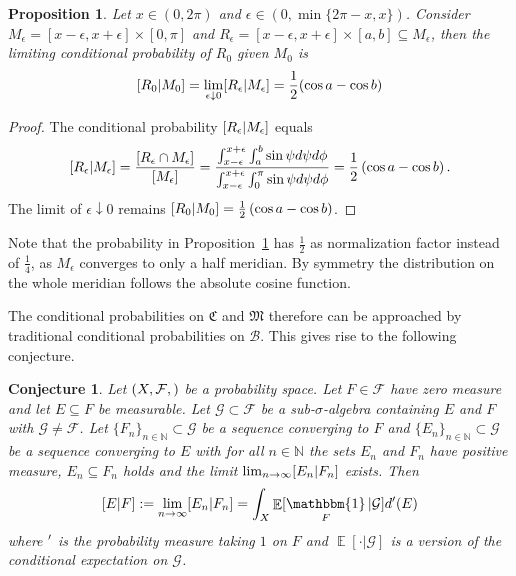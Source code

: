 \documentclass[a4paper]{report}
\theoremstyle{plain}
\newtheorem{proposition}[theorem]{Proposition}
\newtheorem{conjecture}[theorem]{Conjecture}
\theoremstyle{definition}
\theoremstyle{remark}
\numberwithin{equation}{chapter}
\newcommand{\N}{\mathbb{N}}
\let\P\relax
\DeclareMathOperator{\P}{\mathbb{P}}
\DeclareMathOperator{\E}{\mathbb{E}}
\DeclareMathOperator{\1}{\mathbbm{1}}
\newcommand{\F}{\mathcal{F}}
\renewcommand{\G}{\mathcal{G}}
\newcommand{\B}{\mathcal{B}}
\begin{document}
\begin{proposition}\label{prop:BorelMerBayes}
Let $x\in(0,2\pi)$ and $\epsilon\in(0,\min\{2\pi-x,x\})$. Consider $M_\epsilon=[x-\epsilon,x+\epsilon]\times[0,\pi]$ and $R_\epsilon=[x-\epsilon,x+\epsilon]\times[a,b]\subseteq M_\epsilon$, then the limiting conditional probability of $R_0$ given $M_0$ is
\begin{equation}
\P[R_0|M_0]=\lim_{\epsilon\downarrow0}\P[R_\epsilon|M_\epsilon]=\frac{1}{2}(\cos a-\cos b)
\end{equation}
\end{proposition}
\begin{proof}
The conditional probability $\P[R_\epsilon|M_\epsilon]$ equals
\begin{equation}
\P[R_\epsilon|M_\epsilon]=\frac{\P[R_\epsilon\cap M_\epsilon]}{\P[M_\epsilon]}=\frac{\int_{x-\epsilon}^{x+\epsilon}\int_a^b\sin\psi d\psi d\phi}{\int_{x-\epsilon}^{x+\epsilon}\int_0^{\pi}\sin\psi d\psi d\phi}=\frac{1}{2}\left(\cos a-\cos b\right).
\end{equation}
The limit of $\epsilon\downarrow0$ remains $\P[R_0|M_0]=\frac{1}{2}\left(\cos a-\cos b\right)$.
\end{proof}

Note that the probability in Proposition~\ref{prop:BorelMerBayes} has $\frac{1}{2}$ as normalization factor instead of $\frac{1}{4}$, as $M_\epsilon$ converges to only a half meridian. By symmetry the distribution on the whole meridian follows the absolute cosine function.

The conditional probabilities on $\mathfrak{C}$ and $\mathfrak{M}$ therefore can be approached by traditional conditional probabilities on $\B$. This gives rise to the following conjecture.
\begin{conjecture}\label{con:BorelConjecture}
Let $(X,\F,\P)$ be a probability space. Let $F\in\mathcal{F}$ have zero measure and let $E\subseteq F$ be measurable. Let $\G\subset\F$ be a sub-$\sigma$-algebra containing $E$ and $F$ with $\G\neq\F$. Let $\{F_n\}_{n\in\N}\subset\G$ be a sequence converging to $F$ and $\{E_n\}_{n\in\N}\subset\G$ be a sequence converging to $E$ with for all $n\in\N$ the sets $E_n$ and $F_n$ have positive measure, $E_n\subseteq F_n$ holds and the limit $\lim_{n\to\infty}\P[E_n|F_n]$ exists. Then
\begin{equation}
\P[E|F]:=\lim_{n\to\infty}\P[E_n|F_n]=\int_X\E[\1_F|\mathcal{G}]d\P'(E)
\end{equation}
where $\P'$ is the probability measure taking $1$ on $F$ and $\E[\cdot|\G]$ is a version of the conditional expectation on $\G$.
\end{conjecture}
\end{document}
